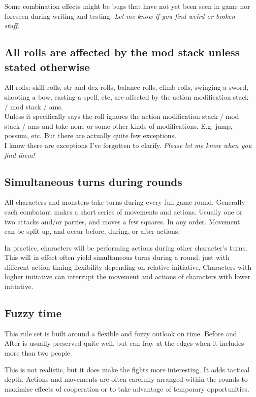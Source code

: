 Some combination effects might be bugs that have not yet been seen in game nor foreseen during writing and testing. \emph{Let me know if you find weird or broken stuff.}


\subsection*{All rolls are affected by the mod stack unless stated otherwise}
All rolls: skill rolls, str and dex rolls, balance rolls, climb rolls, swinging a sword, shooting a bow, casting a spell, etc, are affected by the action modification stack / mod stack / ams.\\
Unless it specifically says the roll ignores the action modification stack / mod stack / ams and take none or some other kinds of modifications. E.g: jump, possum, etc. But there are actually quite few exceptions.\\
\todo I know there are exceptions I've forgotten to clarify. \emph{Please let me know when you find them!}


\subsection*{Simultaneous turns during rounds}
All characters and monsters take turns during every full game round. Generally each combatant makes a short series of movements and actions. Usually one or two attacks and/or parries, and moves a few squares. In any order. Movement can be split up, and occur before, during, or after actions.

In practice, characters will be performing actions during other character's turns. This will in effect often yield simultaneous turns during a round, just with different action timing flexibility depending on relative initiative. Characters with higher initiative can interrupt the movement and actions of characters with lower initiative.


\subsection*{Fuzzy time}
This rule set is built around a flexible and fuzzy outlook on time. Before and After is usually preserved quite well, but can fray at the edges when it includes more than two people.

This is not realistic, but it does make the fights more interesting. It adds tactical depth. Actions and movements are often carefully arranged within the rounds to maximise effects of cooperation or to take advantage of temporary opportunities.


